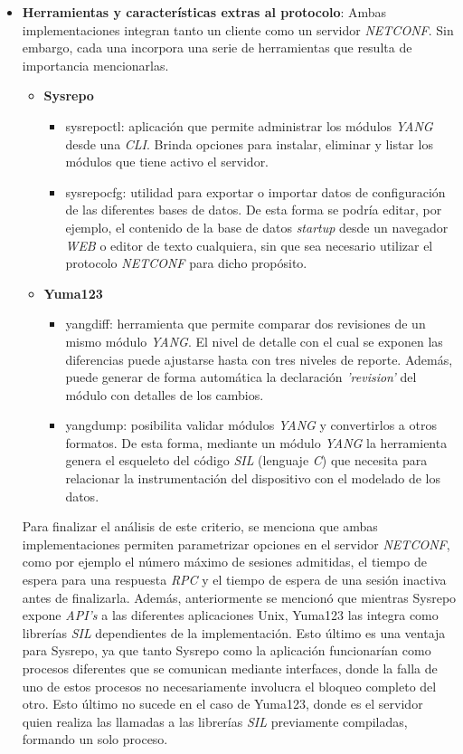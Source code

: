\begin{itemize}
	\item \textbf{Herramientas y características extras al protocolo}: Ambas implementaciones integran tanto un cliente como un servidor \textit{NETCONF}. Sin embargo, cada una incorpora una serie de herramientas que resulta de importancia mencionarlas. 
	\newpage
	\begin{itemize}
		\item \textbf{Sysrepo}
		\begin{itemize}
			\item sysrepoctl: aplicación que permite administrar los módulos \textit{YANG} desde una \textit{CLI}. Brinda opciones para instalar, eliminar y listar los módulos que tiene activo el servidor.
			\item sysrepocfg: utilidad para exportar o importar datos de configuración de las diferentes bases de datos. De esta forma se podría editar, por ejemplo, el contenido de la base de datos \textit{startup} desde un navegador \textit{WEB} o editor de texto cualquiera, sin que sea necesario utilizar el protocolo \textit{NETCONF} para dicho propósito.
		\end{itemize}
		\item \textbf{Yuma123}
		\begin{itemize}
			\item yangdiff: herramienta que permite comparar dos revisiones de un mismo módulo \textit{YANG}. El nivel de detalle con el cual se exponen las diferencias puede ajustarse hasta con tres niveles de reporte. Además, puede generar de forma automática la declaración \textit{'revision'} del módulo con detalles de los cambios.
			\item yangdump: posibilita validar módulos \textit{YANG} y convertirlos a otros formatos. De esta forma, mediante un módulo \textit{YANG} la herramienta genera el esqueleto del código \textit{SIL} (lenguaje \textit{C}) que necesita para relacionar la instrumentación del dispositivo con el modelado de los datos.
		\end{itemize}
	\end{itemize}

	Para finalizar el análisis de este criterio, se menciona que ambas implementaciones permiten parametrizar opciones en el servidor \textit{NETCONF}, como por ejemplo el número máximo de sesiones admitidas, el tiempo de espera para una respuesta \textit{RPC} y el tiempo de espera de una sesión inactiva antes de finalizarla. Además, anteriormente se mencionó que mientras Sysrepo expone \textit{API’s} a las diferentes aplicaciones Unix, Yuma123 las integra como librerías \textit{SIL} dependientes de la implementación. Esto último es una ventaja para Sysrepo, ya que tanto Sysrepo como la aplicación funcionarían como procesos diferentes que se comunican mediante interfaces, donde la falla de uno de estos procesos no necesariamente involucra el bloqueo completo del otro. Esto último no sucede en el caso de Yuma123, donde es el servidor quien realiza las llamadas a las librerías \textit{SIL} previamente compiladas, formando un solo proceso.


\end{itemize}
